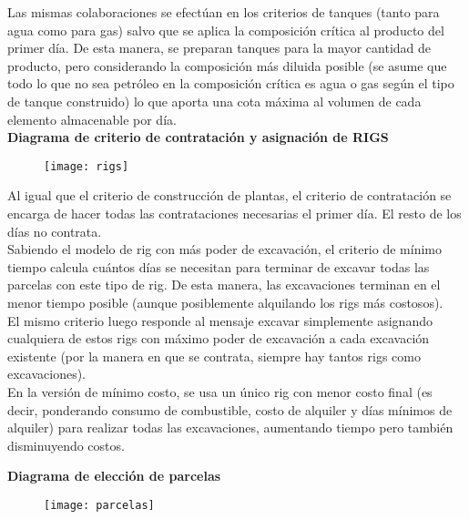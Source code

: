 Las mismas colaboraciones se efectúan en los criterios de tanques (tanto para agua como para gas) salvo que se aplica la composición crítica al producto del primer día. De esta manera, se preparan tanques para la mayor cantidad de producto, pero considerando la composición más diluida posible (se asume que todo lo que no sea petróleo en la composición crítica es agua o gas según el tipo de tanque construido) lo que aporta una cota máxima al volumen de cada elemento almacenable por día. 
\\


\newpage
\textbf{Diagrama de criterio de contratación y asignación de RIGS}

\begin{figure}[H]
\centering
\texttt{[image: rigs]}
\end{figure}

Al igual que el criterio de construcción de plantas, el criterio de contratación se encarga de hacer todas las contrataciones necesarias el primer día. El resto de los días no contrata.
\\

Sabiendo el modelo de rig con más poder de excavación, el criterio de mínimo tiempo calcula cuántos días se necesitan para terminar de excavar todas las parcelas con este tipo de rig. De esta manera, las excavaciones terminan en el menor tiempo posible (aunque posiblemente alquilando los rigs más costosos).
\\

El mismo criterio luego responde al mensaje excavar simplemente asignando cualquiera de estos rigs con máximo poder de excavación a cada excavación existente (por la manera en que se contrata, siempre hay tantos rigs como excavaciones).
\\

En la versión de mínimo costo, se usa un único rig con menor costo final (es decir, ponderando consumo de combustible, costo de alquiler y días mínimos de alquiler) para realizar todas las excavaciones, aumentando tiempo pero también disminuyendo costos.


\newpage
\textbf{Diagrama de elección de parcelas}
\begin{figure}[H]
\texttt{[image: parcelas]}
\end{figure}


